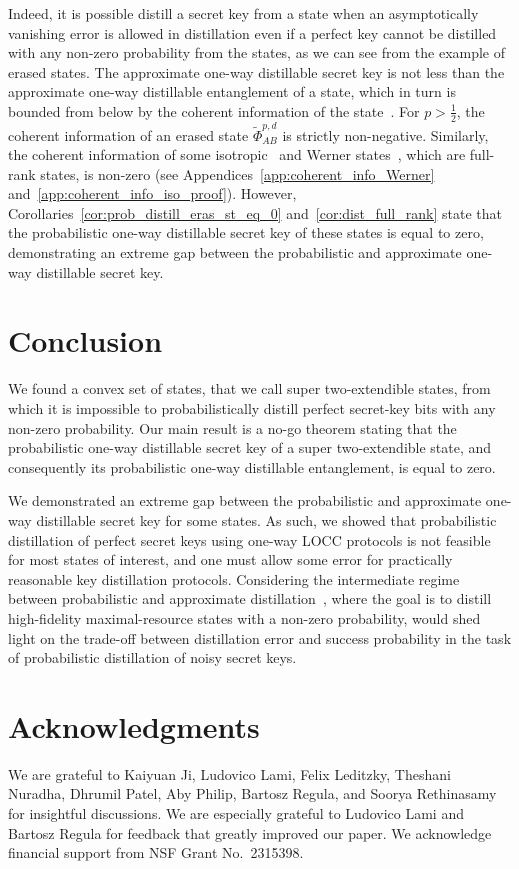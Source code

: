 \documentclass[twocolumn,letterpaper, dvipsnames,allowtoday, accepted = 2025-12-31]{quantumarticle}
\begin{document}
Indeed, it is possible distill a secret key from a state when an asymptotically vanishing error is allowed in distillation even if a perfect key cannot be distilled with any non-zero probability from the states, as we can see from the example of erased states. The approximate one-way distillable secret key is not less than the approximate one-way distillable entanglement of a state, which in turn is bounded from below by the coherent information of the state~\cite[Thm.~10]{DW2005}. For $p > \frac{1}{2} $, the coherent information of an erased state $\widetilde{\Phi}^{p,d}_{AB}$  is strictly non-negative. Similarly, the coherent information of some isotropic~\cite{HH99} and Werner states~\cite{Wer89_HV}, which are full-rank states, is non-zero (see Appendices~\ref{app:coherent_info_Werner} and~\ref{app:coherent_info_iso_proof}). However, Corollaries~\ref{cor:prob_distill_eras_st_eq_0} and~\ref{cor:dist_full_rank} state that the probabilistic one-way distillable secret key of these states is equal to zero, demonstrating an extreme gap between the probabilistic and approximate one-way distillable secret key.

\section{Conclusion}

We found a convex set of states, that we call super two-extendible states, from which it is impossible to probabilistically distill perfect secret-key bits with any non-zero probability. Our main result is a no-go theorem stating that the probabilistic one-way distillable secret key of a super two-extendible state, and consequently its probabilistic one-way distillable entanglement, is equal to zero.

We demonstrated an extreme gap between the probabilistic and approximate one-way distillable secret key for some  states. As such, we showed that probabilistic distillation of perfect secret keys using one-way LOCC protocols is not feasible for most states of interest, and one must allow some error for practically reasonable key distillation protocols. Considering the intermediate regime between probabilistic and approximate distillation~\cite{FL20, Regula22, EW22}, where the goal is to distill high-fidelity maximal-resource states with a non-zero probability, would shed light on the trade-off between distillation error and success probability in the task of probabilistic distillation of noisy secret keys.

\section*{Acknowledgments}
We are grateful to Kaiyuan Ji, Ludovico Lami, Felix Leditzky, Theshani Nuradha, Dhrumil Patel, Aby Philip, Bartosz Regula, and Soorya Rethinasamy for insightful discussions. We are especially grateful to  Ludovico Lami and Bartosz Regula for feedback that greatly improved our paper. We acknowledge financial support from NSF Grant No.~2315398.
\end{document}
